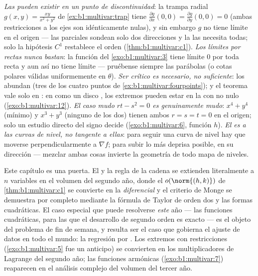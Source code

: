 \begin{remark}
\label{rem:b1:multivar:pitfalls}
\emph{Las  pueden existir en un punto de
discontinuidad}: la trampa radial $g(x,y) = \frac{xy}{x^2+y^2}$ de
\cref{ex:b1:multivar:trap} tiene $\frac{\partial g}{\partial
x}(0,0) = \frac{\partial g}{\partial y}(0,0) = 0$ (ambas restricciones
a los ejes son idénticamente nulas), y sin embargo $g$ no tiene límite en el
origen --- las parciales sondean solo dos direcciones y la 
las necesita todas; solo la hipótesis $C^1$ restablece el orden
(\cref{thm:b1:multivar:c1}).
\emph{Los límites por rectas nunca bastan}: la función del
\cref{exo:b1:multivar:3} tiene límite $0$ por toda recta y aun así no
tiene límite --- pruébense siempre las parábolas (o cotas polares
válidas uniformemente en $\theta$).
\emph{Ser crítico es necesario, no suficiente}: los 
abundan (tres de los cuatro puntos de \cref{ex:b1:multivar:fourpoints}); y
el teorema vale solo en \emph{}: en  como un disco ,
los extremos pueden estar en la  con  no nulo
(\cref{exo:b1:multivar:12}).
\emph{El caso mudo $rt - s^2 = 0$ es genuinamente mudo}: $x^4
+ y^4$ (mínimo) y $x^3 + y^3$ (ninguno de los dos) tienen ambos $r = s = t
= 0$ en el origen; solo un estudio directo del signo decide
(\cref{exo:b1:multivar:6}, función $h$).
\emph{El  es  a las curvas de nivel, no tangente
a ellas}: para seguir una curva de nivel hay que moverse perpendicularmente a $\nabla
f$; para subir lo más deprisa posible, en su dirección --- mezclar ambas cosas invierte
la geometría de todo mapa de niveles.
\end{remark}

\begin{remark}
\label{rem:b1:multivar:whereused}
Este capítulo es una puerta. El  y la regla de la cadena se extienden
literalmente a $n$ variables en el volumen del segundo año, donde el
$o(\norm{(h,k)})$ de \cref{thm:b1:multivar:c1} se convierte en la
\emph{diferencial} y el criterio de Monge se demuestra por completo mediante la
fórmula de Taylor de orden dos y las formas cuadráticas. El caso especial
que puede resolverse \emph{este} año --- las funciones cuadráticas,
para las que el desarrollo de segundo orden es exacto --- es el objeto
del problema de fin de semana, y resulta ser el caso que gobierna
el ajuste de datos en todo el mundo: la regresión por . Los
extremos con restricciones (\cref{exo:b1:multivar:5} fue un anticipo) se convierten
en los multiplicadores de Lagrange del segundo año; las funciones armónicas
(\cref{exo:b1:multivar:7}) reaparecen en el análisis complejo del
volumen del tercer año.
\end{remark}

